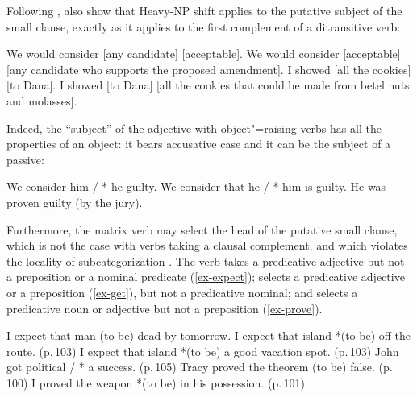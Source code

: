 \ealnoraggedright
{}
\label{w}
\zl

Following \citet[420--423]{Bresnan1982},
\citet[113]{PollardandSag1994} also show that Heavy-NP shift
applies to the putative subject of the small clause, exactly as it applies to the first complement
of a ditransitive verb:

\eal
\ex We would consider [any candidate] [acceptable].
\ex We would consider [acceptable]  [any candidate who supports the proposed amendment].
\ex I showed [all the cookies] [to Dana].
\ex I showed [to Dana]  [all the cookies that could be made from betel nuts and molasses].  
\zl

Indeed, the ``subject'' of the adjective with object"=raising verbs has all the properties of an
object: it bears accusative case and it can be the subject of a passive:

\eal
\ex We consider him / * he guilty.
\ex We consider that he / * him is guilty.
\ex He was proven guilty (by the jury).	
\zl
	

Furthermore, the matrix verb may select the head of the putative small clause, which is not the case
with verbs taking a clausal complement, and which violates the 
locality of subcategorization \parencites[]{PollardandSag1994}{Sag2007a}. The
verb  takes a predicative adjective but not a preposition or a nominal predicate (\ref{ex-expect});
 selects a predicative adjective or a preposition (\ref{ex-get}), but not a predicative nominal; and
 selects a predicative noun or adjective but not a preposition (\ref{ex-prove}).


\eal
\label{ex-expect}
\ex I expect that man (to be) dead  by tomorrow. \citep[]{PollardandSag1994}
\ex I expect that island *(to be) off the route. (p.\,103)
\ex I expect that island *(to be) a good vacation spot. (p.\,103)
\zl
\ea
\label{ex-get}
John got political / * a success. (p.\,105)	
\z
\eal
\label{ex-prove}
\ex Tracy proved the theorem (to be) false. (p.\,100)
\ex I proved the weapon *(to be) in his possession.	(p.\,101)
\zl
	


